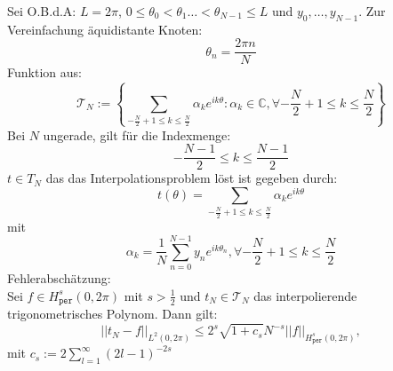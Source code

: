 \documentclass{report}
\begin{document}
 {
  Sei O.B.d.A: $L= 2\pi$, $0 \leq \theta_0 < \theta_1 \dots 
    < \theta_{N-1} \leq L
  $
  und $y_0, \dots, y_{N-1}$.
  Zur Vereinfachung äquidistante Knoten:
  \[
    \theta_n = \frac{2\pi n}{N}
  \]
  Funktion aus: 
  \[
    \mathcal{T}_N := 
    \left\{\sum_{-\frac{N}{2} +1 \leq k \leq \frac{N}{2}}
      \alpha_ke^{ik\theta} : \alpha_k \in \mathbb{C},
      \forall -\frac{N}{2}+1\leq k \leq \frac{N}{2}
    \right\}
  \]
  Bei $N$ ungerade, gilt für die Indexmenge:
  \[
    -\frac{N-1}{2} \leq k \leq \frac{N-1}{2}
  \]
  $t \in T_N$ das das Interpolationsproblem löst 
  ist gegeben durch:
  \[
    t(\theta) = \sum_{-\frac{N}{2} +1 \leq k \leq \frac{N}{2}}
      \alpha_ke^{ik\theta}
  \]
  mit
  \[
    \alpha_k = \frac{1}{N}\sum_{n=0}^{N-1}y_ne^{ik\theta_n}, 
    \forall-\frac{N}{2} +1 \leq k \leq \frac{N}{2}
  \]
  Fehlerabschätzung:\\
  Sei $f \in H^s_\texttt{per}(0,2\pi)$ mit $s > \frac{1}{2}$
  und $t_N \in \mathcal{T}_N$ das interpolierende trigonometrisches
  Polynom. Dann gilt: 
  \[
    ||t_N-f||_{L^2(0,2\pi)} \leq 2^s 
    \sqrt{1 + c_s } N^{-s}||f||_{H^s_\texttt{per}(0,2\pi)},
  \]
  mit $c_s := 2 \sum^{\infty}_{l=1} (2l-1)^{-2s}$
}
\end{document}
